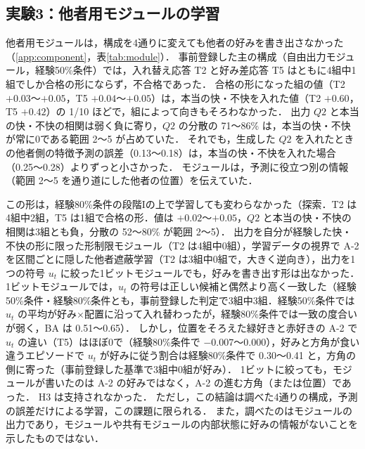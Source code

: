 \subsection{実験3：他者用モジュールの学習}\label{sec:res-module}

他者用モジュールは，構成を4通りに変えても他者の好みを書き出さなかった（\ref{app:component}，表\ref{tab:module}）．
事前登録した主の構成（自由出力モジュール，経験50\%条件）では，入れ替え応答 T2 と好み差応答 T5 はともに4組中1組でしか合格の形にならず，不合格であった．
合格の形になった組の値（T2 $+0.03$〜$+0.05$，T5 $+0.04$〜$+0.05$）は，本当の快・不快を入れた値（T2 $+0.60$，T5 $+0.42$）の 1/10 ほどで，組によって向きもそろわなかった．
出力 $Q2$ と本当の快・不快の相関は弱く負に寄り，$Q2$ の分散の 71〜86\% は，本当の快・不快が常に0である範囲 2〜5 が占めていた．
それでも，生成した $Q2$ を入れたときの他者側の特徴予測の誤差（0.13〜0.18）は，本当の快・不快を入れた場合（0.25〜0.28）よりずっと小さかった．
モジュールは，予測に役立つ別の情報（範囲 2〜5 を通り道にした他者の位置）を伝えていた．

この形は，経験80\%条件の段階Iの上で学習しても変わらなかった（探索．T2 は4組中2組，T5 は1組で合格の形．値は $+0.02$〜$+0.05$，$Q2$ と本当の快・不快の相関は3組とも負，分散の 52〜80\% が範囲 2〜5）．
出力を自分が経験した快・不快の形に限った形制限モジュール（T2 は4組中0組），学習データの視界で A-2 を区間ごとに隠した他者遮蔽学習（T2 は3組中0組で，大きく逆向き），出力を1つの符号 $u_t$ に絞った1ビットモジュールでも，好みを書き出す形は出なかった．
1ビットモジュールでは，$u_t$ の符号は正しい候補と偶然より高く一致した（経験50\%条件・経験80\%条件とも，事前登録した判定で3組中3組．経験50\%条件では $u_t$ の平均が好み×配置に沿って入れ替わったが，経験80\%条件では一致の度合いが弱く，BA は 0.51〜0.65）．
しかし，位置をそろえた緑好きと赤好きの A-2 で $u_t$ の違い（T5）はほぼ0で（経験80\%条件で $-0.007$〜$0.000$），好みと方角が食い違うエピソードで $u_t$ が好みに従う割合は経験80\%条件で 0.30〜0.41 と，方角の側に寄った（事前登録した基準で3組中0組が好み）．
1ビットに絞っても，モジュールが書いたのは A-2 の好みではなく，A-2 の進む方角（または位置）であった．
H3 は支持されなかった．
ただし，この結論は調べた4通りの構成，予測の誤差だけによる学習，この課題に限られる．
また，調べたのはモジュールの出力であり，モジュールや共有モジュールの内部状態に好みの情報がないことを示したものではない．

